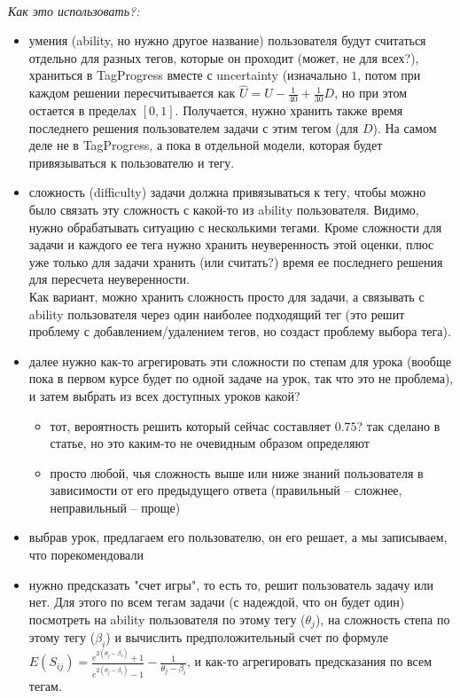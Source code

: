 \documentclass[12pt]{article}
\begin{document}
\bigskip\\\indent\textit{\Large Как это использовать?:}
    \begin{itemize}
        \item умения (ability, но нужно другое название) пользователя будут считаться отдельно для разных тегов, которые он проходит (может, не для всех?), храниться в TagProgress вместе с uncertainty (изначально $1$, потом при каждом решении пересчитывается как $\hat{U} = U - \frac{1}{40} + \frac{1}{30} D$, но при этом остается в пределах $[0, 1]$. Получается, нужно хранить также время последнего решения пользователем задачи с этим тегом (для $D$). На самом деле не в TagProgress, а пока в отдельной модели, которая будет привязываться к пользователю и тегу.
        \item сложность (difficulty) задачи должна привязываться к тегу, чтобы можно было связать эту сложность с какой-то из ability пользователя. Видимо, нужно обрабатывать ситуацию с несколькими тегами. Кроме сложности для задачи и каждого ее тега нужно хранить неуверенность этой оценки, плюс уже только для задачи хранить (или считать?) время ее последнего решения для пересчета неуверенности. \\ Как вариант, можно хранить сложность просто для задачи, а связывать с ability пользователя через один наиболее подходящий тег (это решит проблему с добавлением/удалением тегов, но создаст проблему выбора тега).
        \item далее нужно как-то агрегировать эти сложности по степам для урока (вообще пока в первом курсе будет по одной задаче на урок, так что это не проблема), и затем выбрать из всех доступных уроков какой?
            \begin{itemize}
                \item тот, вероятность решить который сейчас составляет $0.75$? так сделано в статье, но это каким-то не очевидным образом определяют
                \item просто любой, чья сложность выше или ниже знаний пользователя в зависимости от его предыдущего ответа (правильный -- сложнее, неправильный -- проще)
            \end{itemize}
        \item выбрав урок, предлагаем его пользователю, он его решает, а мы записываем, что порекомендовали
        \item нужно предсказать "счет игры", то есть то, решит пользователь задачу или нет. Для этого по всем тегам задачи (с надеждой, что он будет один) посмотреть на ability пользователя по этому тегу ($\theta_j$), на сложность степа по этому тегу ($\beta_i$) и вычислить предположительный счет по формуле $E(S_{ij}) = \frac{e^{2 (\theta_j - \beta_i)} + 1}{e^{2 (\theta_j - \beta_i)} - 1} - \frac{1}{\theta_j - \beta_i}$, и как-то агрегировать предсказания по всем тегам.

\end{itemize}
\end{document}
